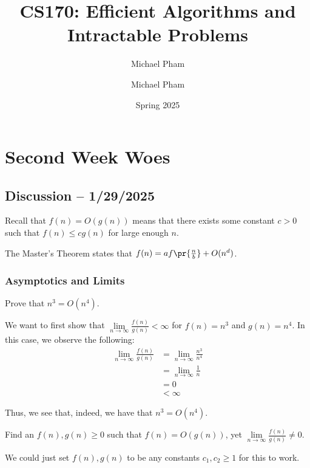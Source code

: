 \documentclass[openany]{book}
\title{#1}
\author{Michael Pham}
\date{#2}
\renewcommand{\mytitle}[2]{%
	\title{#1}
	\author{Michael Pham}
	\date{#2}
	\maketitle
	\newpage
	\mytoc
	\newpage
}
\begin{document}
\mytitle{CS170: Efficient Algorithms and Intractable Problems}{Spring 2025}

\chapter{Second Week Woes}
\section{Discussion -- 1/29/2025}
Recall that $f(n) = O(g(n))$ means that there exists some constant $c > 0$ such that $f(n) \leq cg(n)$ for large enough $n$.

\begin{thm}
	The Master's Theorem states that $f(n) = af\pr{\frac{n}{b}} + O(n^{d})$.
\end{thm}

\subsection{Asymptotics and Limits}
\begin{hw}
	Prove that $n^{3} = O(n^{4})$.
\end{hw}
\begin{solution}
	We want to first show that $\lim\limits_{n\rightarrow\infty} \frac{f(n)}{g(n)} < \infty$ for $f(n) = n^{3}$ and $g(n) = n^{4}$. In this case, we observe the following:
	\begin{align*}
		\lim_{n\rightarrow\infty} \frac{f(n)}{g(n)} &= \lim_{n\rightarrow\infty} \frac{n^{3}}{n^{4}} \\
		&= \lim_{n\rightarrow\infty} \frac{1}{n} \\
		&= 0 \\
		&< \infty
	\end{align*}
	
	Thus, we see that, indeed, we have that $n^{3} = O(n^{4})$.
\end{solution}

\begin{hw}
	Find an $f(n), g(n) \geq 0$ such that $f(n) = O(g(n))$, yet $\lim\limits_{n\rightarrow\infty} \frac{f(n)}{g(n)} \neq 0$.
\end{hw}
\begin{solution}
	We could just set $f(n), g(n)$ to be any constants $c_1, c_2 \geq 1$ for this to work.
\end{solution}
\end{document}
